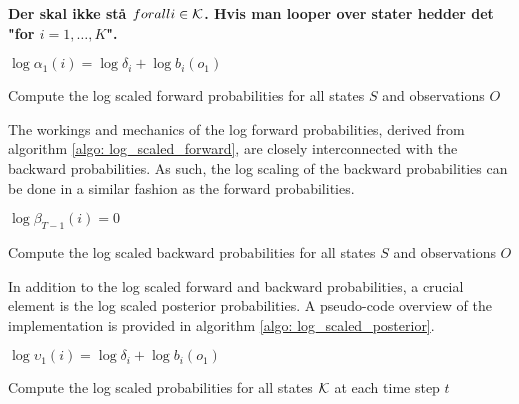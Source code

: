 \textbf{Der skal ikke stå $for all i \in \operatorname{\mathcal{K}}$. Hvis man looper over stater hedder det "for $i=1,\ldots,K$".}

\begin{algorithm}[H]

    {$\log\alpha_{1}(i) = \log\delta_i + \log b_i(o_1) $}  \;
        
\caption{Compute the log scaled forward probabilities for all states $S$ and observations $O$}
\label{algo: log_scaled_forward}
\end{algorithm}

The workings and mechanics of the log forward probabilities, derived from algorithm \ref{algo: log_scaled_forward}, are closely interconnected with the backward probabilities. As such, the log scaling of the backward probabilities can be done in a similar fashion as the forward probabilities.   

\begin{algorithm}[H]
{$\log \beta_{T-1}(i) = 0$} \;


\caption{Compute the log scaled backward probabilities for all states $S$ and observations $O$}
\label{algo: log_scaled_backward}
\end{algorithm}

In addition to the log scaled forward and backward probabilities, a crucial element is the log scaled posterior probabilities. A pseudo-code overview of the implementation is provided in algorithm \ref{algo: log_scaled_posterior}.


\begin{algorithm}[H]
{$\log \upsilon_1(i) = \log \delta_i + \log b_i(o_1)$}\;


\caption{Compute the log scaled probabilities for all states $\operatorname{\mathcal{K}}$ at each time step $t$}
\label{algo: log_scaled_posterior}
\end{algorithm}


